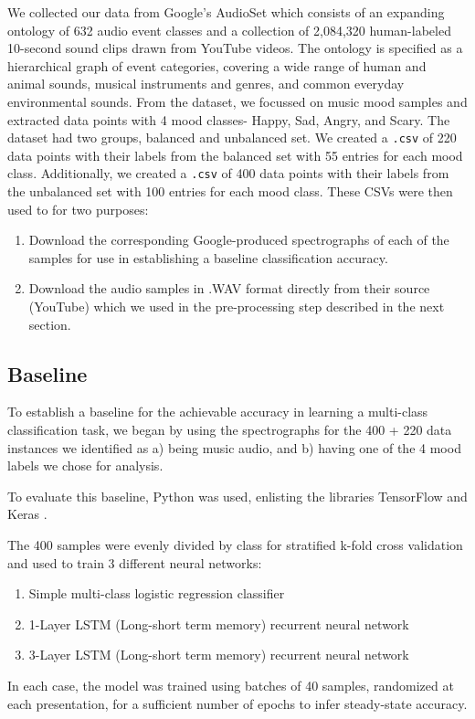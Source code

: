 \documentclass{article}
\begin{document}
We collected our data from Google’s AudioSet \cite{audioset} which consists of an expanding ontology of 632 audio event classes and a collection of 2,084,320 human-labeled 10-second sound clips drawn from YouTube videos. The ontology is specified as a hierarchical graph of event categories, covering a wide range of human and animal sounds, musical instruments and genres, and common everyday environmental sounds. From the dataset, we focussed on music mood samples and extracted data points with 4 mood classes- Happy, Sad, Angry, and Scary. The dataset had two groups, balanced and unbalanced set. We created a \texttt{.csv} of 220 data points with their labels from the balanced set with 55 entries for each mood class. Additionally, we created a \texttt{.csv} of 400 data points with their labels from the unbalanced set with 100 entries for each mood class. These CSVs were then used to for two purposes:
\begin{enumerate}
\item Download the corresponding Google-produced spectrographs of each of the samples for use in establishing a baseline classification accuracy.
\item Download the audio samples in .WAV format directly from their source (YouTube) which we used in the pre-processing step described in the next section.
\end{enumerate}


\subsection{Baseline}

To establish a baseline for the achievable accuracy in learning a  multi-class classification task, we began by using the spectrographs for the 400 + 220 data instances we identified as a) being music audio, and b) having one of the 4 mood labels we chose for analysis.

To evaluate this baseline, Python was used, enlisting the libraries TensorFlow \cite{tensorflow} and Keras \cite{keras}.

The 400 samples were evenly divided by class for stratified k-fold cross validation and used to train 3 different neural networks:
\begin{enumerate}
\item Simple multi-class logistic regression classifier
\item 1-Layer LSTM (Long-short term memory) recurrent neural network
\item 3-Layer LSTM (Long-short term memory) recurrent neural network
\end{enumerate}
In each case, the model was trained using batches of 40 samples, randomized at each presentation, for a sufficient number of epochs to infer steady-state accuracy.
\end{document}
